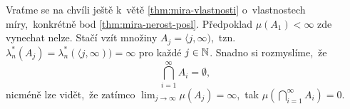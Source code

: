 \begin{remark}
    Vraťme se na chvíli ještě k~větě \ref{thm:mira-vlastnosti} o~vlastnostech míry,~konkrétně bod \ref{thm:mira-nerost-posl}. Předpoklad $\mu(A_1)<\infty$ zde vynechat nelze. Stačí vzít množiny $A_j=\langle j,\infty)$,~tzn. $\lambda_n^*(A_j)=\lambda_n^*(\langle j,\infty))=\infty$ pro každé $j\in\mathbb{N}$. Snadno si rozmyslíme,~že
    \[\bigcap_{i=1}^\infty A_i=\emptyset,\]
    nicméně lze vidět,~že zatímco $\lim_{j\to\infty}\mu(A_j)=\infty$,~tak $\mu\left(\bigcap_{i=1}^\infty A_i\right)=0$.
\end{remark}

